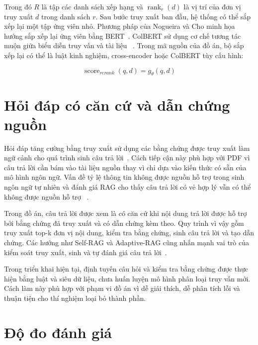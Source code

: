 \documentclass[../DoAn.tex]{subfiles}
\begin{document}
Trong đó \(R\) là tập các danh sách xếp hạng và \(\operatorname{rank}_r(d)\) là vị trí
của đơn vị truy xuất \(d\) trong danh sách \(r\). Sau bước truy xuất ban đầu, hệ thống có thể
sắp xếp lại một tập ứng viên nhỏ. Phương pháp của Nogueira và Cho minh họa
hướng sắp xếp lại ứng viên bằng BERT~\cite{nogueira2019passage}. ColBERT sử
dụng cơ chế tương tác muộn giữa biểu diễn truy vấn và tài liệu~
\cite{khattab2020colbert}. Trong mã nguồn của đồ án, bộ sắp xếp lại có thể là
luật kinh nghiệm, cross-encoder hoặc ColBERT tùy cấu hình:

\begin{equation}
\label{eq:rerank-score}
\operatorname{score}_{rerank}(q,d)=g_{\theta}(q,d)
\end{equation}

\section{Hỏi đáp có căn cứ và dẫn chứng nguồn}
\label{section:grounded-qa-foundation}

Hỏi đáp tăng cường bằng truy xuất sử dụng các bằng chứng được truy xuất làm ngữ
cảnh cho quá trình sinh câu trả lời~\cite{lewis2020rag}. Cách tiếp cận này phù hợp
với PDF vì câu trả lời cần bám vào tài liệu nguồn thay vì chỉ dựa vào kiến thức có
sẵn của mô hình ngôn ngữ. Vấn đề tỷ lệ thông tin không được nguồn hỗ trợ trong sinh ngôn ngữ tự nhiên và đánh giá RAG cho thấy câu
trả lời có vẻ hợp lý vẫn có thể không được nguồn hỗ trợ~
\cite{ji2023hallucination,es2023ragas}.

Trong đồ án, câu trả lời được xem là có căn cứ khi nội dung trả lời được hỗ trợ bởi
bằng chứng đã truy xuất và có dẫn chứng kèm theo. Quy trình vì vậy gồm truy xuất
top-k đơn vị nội dung, kiểm tra bằng chứng, sinh câu trả lời và tạo dẫn chứng. Các hướng như
Self-RAG và Adaptive-RAG cũng nhấn mạnh vai trò của kiểm soát truy xuất, sinh
và tự đánh giá câu trả lời~\cite{asai2024selfrag,jeong2024adaptiverag}.

Trong triển khai hiện tại, định tuyến câu hỏi và kiểm tra bằng chứng được thực hiện
bằng luật và siêu dữ liệu, chưa huấn luyện mô hình phân loại truy vấn mới. Cách làm
này phù hợp với phạm vi đồ án vì dễ giải thích, dễ phân tích lỗi và thuận tiện cho
thí nghiệm loại bỏ thành phần.

\section{Độ đo đánh giá}
\label{section:evaluation-foundation}
\end{document}

